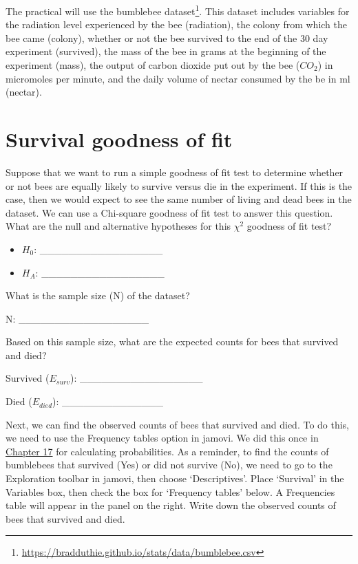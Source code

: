 \documentclass[
  openany]{scrbook}
\begin{document}
The practical will use the bumblebee dataset\footnote{\url{https://bradduthie.github.io/stats/data/bumblebee.csv}}.
This dataset includes variables for the radiation level experienced by the bee (radiation), the colony from which the bee came (colony), whether or not the bee survived to the end of the 30 day experiment (survived), the mass of the bee in grams at the beginning of the experiment (mass), the output of carbon dioxide put out by the bee (\(CO_2\)) in micromoles per minute, and the daily volume of nectar consumed by the be in ml (nectar).

\hypertarget{survival-goodness-of-fit}{%
\section{Survival goodness of fit}\label{survival-goodness-of-fit}}

Suppose that we want to run a simple goodness of fit test to determine whether or not bees are equally likely to survive versus die in the experiment.
If this is the case, then we would expect to see the same number of living and dead bees in the dataset.
We can use a Chi-square goodness of fit test to answer this question.
What are the null and alternative hypotheses for this \(\chi^{2}\) goodness of fit test?

\begin{itemize}
\item
  \(H_{0}\): \_\_\_\_\_\_\_\_\_\_\_\_\_\_\_\_\_
\item
  \(H_{A}\): \_\_\_\_\_\_\_\_\_\_\_\_\_\_\_\_\_
\end{itemize}

What is the sample size (N) of the dataset?

N: \_\_\_\_\_\_\_\_\_\_\_\_\_\_\_\_\_\_

Based on this sample size, what are the expected counts for bees that survived and died?

Survived (\(E_{surv}\)): \_\_\_\_\_\_\_\_\_\_\_\_\_\_\_\_\_

Died (\(E_{died}\)): \_\_\_\_\_\_\_\_\_\_\_\_\_\_

Next, we can find the observed counts of bees that survived and died.
To do this, we need to use the Frequency tables option in jamovi.
We did this once in \protect\hyperlink{Chapter_17}{Chapter 17} for calculating probabilities.
As a reminder, to find the counts of bumblebees that survived (Yes) or did not survive (No), we need to go to the Exploration toolbar in jamovi, then choose `Descriptives'.
Place `Survival' in the Variables box, then check the box for `Frequency tables' below.
A Frequencies table will appear in the panel on the right.
Write down the observed counts of bees that survived and died.
\end{document}
